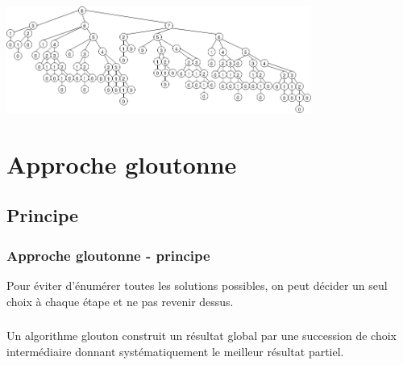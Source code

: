 \documentclass[svgnames,11pt]{beamer}
\begin{document}
\begin{frame}
    \frametitle{}

    \begin{center}
        \centering
        \includegraphics[width=10cm]{ressources/appel-naif-8.png}
        \label{IMG}
    \end{center}

\end{frame}
\section{Approche gloutonne}
\subsection{Principe}
\begin{frame}
    \frametitle{Approche gloutonne - principe}
\begin{center}
    Pour éviter d'énumérer toutes les solutions possibles, on peut décider un seul choix à chaque étape et ne pas revenir dessus.
\end{center}
    

\end{frame}
\begin{frame}
    \frametitle{}

    \begin{aretenir}[]
        Un algorithme glouton construit un résultat global par une succession de choix intermédiaire donnant systématiquement le meilleur résultat partiel.
    \end{aretenir}

\end{frame}
\begin{frame}
    \frametitle{}

    \begin{center}
    \end{center}

\end{frame}
\end{document}
